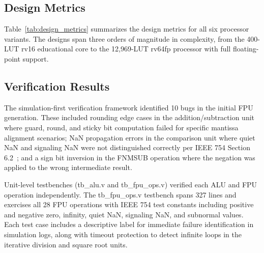 \documentclass[journal]{IEEEtran}
\begin{document}
\subsection{Design Metrics}

Table~\ref{tab:design_metrics} summarizes the design metrics for all six processor variants. The designs span three orders of magnitude in complexity, from the 400-LUT rv16 educational core to the 12,969-LUT rv64fp processor with full floating-point support.

\begin{table}[!t]
\caption{Design Metrics for All Processor Variants}
\label{tab:design_metrics}
\centering
{}
\end{table}

\subsection{Verification Results}

The simulation-first verification framework identified 10 bugs in the initial FPU generation. These included rounding edge cases in the addition/subtraction unit where guard, round, and sticky bit computation failed for specific mantissa alignment scenarios; NaN propagation errors in the comparison unit where quiet NaN and signaling NaN were not distinguished correctly per IEEE 754 Section 6.2~\cite{ieee754_2019}; and a sign bit inversion in the FNMSUB operation where the negation was applied to the wrong intermediate result.

Unit-level testbenches (tb\_alu.v and tb\_fpu\_ops.v) verified each ALU and FPU operation independently. The tb\_fpu\_ops.v testbench spans 327 lines and exercises all 28 FPU operations with IEEE 754 test constants including positive and negative zero, infinity, quiet NaN, signaling NaN, and subnormal values. Each test case includes a descriptive label for immediate failure identification in simulation logs, along with timeout protection to detect infinite loops in the iterative division and square root units.
\end{document}
